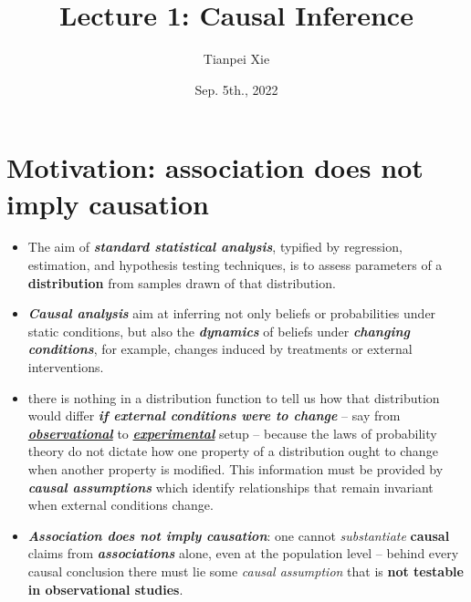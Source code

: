 \documentclass[11pt]{article}
\begin{document}
\title{Lecture 1: Causal Inference}
\author{ Tianpei Xie}
\date{Sep. 5th., 2022 }
\maketitle
\tableofcontents
\newpage
\allowdisplaybreaks
\section{Motivation: association does not imply causation}
\begin{itemize}
\item The aim of \emph{\textbf{standard statistical analysis}}, typified by regression, estimation, and hypothesis testing techniques, is to assess parameters of a \textbf{distribution} from samples drawn of that distribution.

\item  \emph{\textbf{Causal analysis}}  aim at inferring not only beliefs or probabilities under static conditions, but also the \emph{\textbf{dynamics}} of beliefs under \emph{\textbf{changing conditions}}, for example, changes induced by treatments or external interventions.

\item there is nothing in a distribution function to tell us how that distribution would differ \emph{\textbf{if external conditions were to change}} -- say from \underline{\textbf{\emph{observational}}} to \underline{\textbf{\emph{experimental}}} setup -- because the laws of probability theory do not dictate how one property
of a distribution ought to change when another property is modified. This information must be provided by \emph{\textbf{causal assumptions}} which identify relationships
that remain invariant when external conditions change. \citep{pearl2009causal}

\item \emph{\textbf{Association does not imply causation}}: one cannot \emph{substantiate} \textbf{causal} claims from \textbf{\emph{associations}} alone, even at the population level -- behind every causal conclusion there must lie some \emph{causal assumption} that is \textbf{not testable in observational studies}. \citep{pearl2009causal}


\end{itemize}
\end{document}
